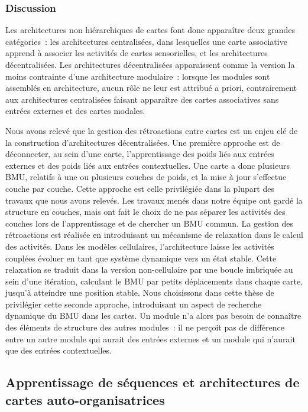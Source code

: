 \documentclass[../main]{subfiles}
\begin{document}
\subsubsection{Discussion}

Les architectures non hiérarchiques de cartes font donc apparaître deux grandes catégories~: les architectures centralisées, dans lesquelles une carte associative apprend à associer les activités de cartes sensorielles, et les architectures décentralisées.
Les architectures décentralisées apparaissent comme la version la moins contrainte d'une architecture modulaire~: lorsque les modules sont assemblés en architecture, aucun rôle ne leur est attribué a priori, contrairement aux architectures centralisées faisant apparaître des cartes associatives sans entrées externes et des cartes modales.

Nous avons relevé que la gestion des rétroactions entre cartes est un enjeu clé de la construction d'architectures décentralisées. Une première approche est de déconnecter, au sein d'une carte, l'apprentissage des poids liés aux entrées externes et des poids liés aux entrées contextuelles. Une carte a donc plusieurs BMU, relatifs à une ou plusieurs couches de poids, et la mise à jour s'effectue couche par couche. Cette approche est celle privilégiée dans la plupart des travaux que nous avons relevés.
Les travaux menés dans notre équipe ont gardé la structure en couches, mais ont fait le choix de ne pas séparer les activités des couches lors de l'apprentissage et de chercher un BMU commun.
La gestion des rétroactions est réalisée en introduisant un mécanisme de relaxation dans le calcul des activités. Dans les modèles cellulaires, l'architecture laisse les activités couplées évoluer en tant que système dynamique vers un état stable. Cette relaxation se traduit dans la version non-cellulaire par une boucle imbriquée au sein d'une itération, calculant le BMU par petits déplacements dans chaque carte, jusqu'à atteindre une position stable.
Nous choisissons dans cette thèse de privilégier cette seconde approche, introduisant un aspect de recherche dynamique du BMU dans les cartes. Un module n'a alors pas besoin de connaître des éléments de structure des autres modules~: il ne perçoit pas de différence entre un autre module qui aurait des entrées externes et un module qui n'aurait que des entrées contextuelles.


\subsection{Apprentissage de séquences et architectures de cartes auto-organisatrices}
\end{document}
